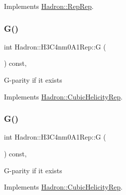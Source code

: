 Implements \mbox{\hyperlink{structHadron_1_1RepRep_a92c8802e5ed7afd7da43ccfd5b7cd92b}{Hadron\+::\+Rep\+Rep}}.

\mbox{\label{structHadron_1_1H3C4nm0A1Rep_a3810b23921892d986902dcacbd808705}} 
\subsubsection{\texorpdfstring{G()}{G()}\hspace{0.1cm}{\footnotesize\ttfamily [1/3]}}
{\footnotesize\ttfamily int Hadron\+::\+H3\+C4nm0\+A1\+Rep\+::G (\begin{DoxyParamCaption}{ }\end{DoxyParamCaption}) const\hspace{0.3cm}{\ttfamily [inline]}, {\ttfamily [virtual]}}

G-\/parity if it exists 

Implements \mbox{\hyperlink{structHadron_1_1CubicHelicityRep_a50689f42be1e6170aa8cf6ad0597018b}{Hadron\+::\+Cubic\+Helicity\+Rep}}.

\mbox{\label{structHadron_1_1H3C4nm0A1Rep_a3810b23921892d986902dcacbd808705}} 
\subsubsection{\texorpdfstring{G()}{G()}\hspace{0.1cm}{\footnotesize\ttfamily [2/3]}}
{\footnotesize\ttfamily int Hadron\+::\+H3\+C4nm0\+A1\+Rep\+::G (\begin{DoxyParamCaption}{ }\end{DoxyParamCaption}) const\hspace{0.3cm}{\ttfamily [inline]}, {\ttfamily [virtual]}}

G-\/parity if it exists 

Implements \mbox{\hyperlink{structHadron_1_1CubicHelicityRep_a50689f42be1e6170aa8cf6ad0597018b}{Hadron\+::\+Cubic\+Helicity\+Rep}}.

\mbox{\label{structHadron_1_1H3C4nm0A1Rep_a3810b23921892d986902dcacbd808705}} 

